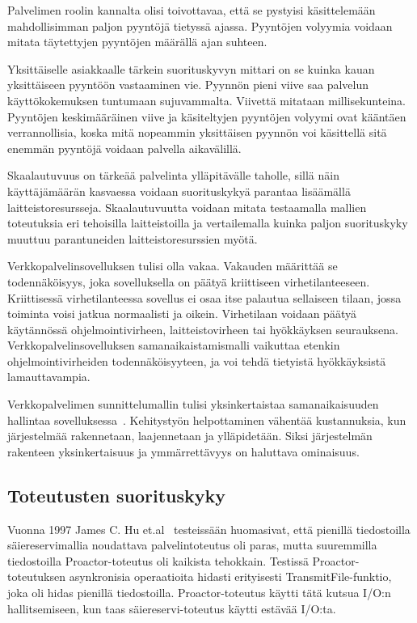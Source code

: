 \documentclass[finnish]{tktltiki2}%
\theoremstyle{definition}
\theoremstyle{remark}
\begin{document}
Palvelimen roolin kannalta olisi toivottavaa, että
se pystyisi käsittelemään mahdollisimman paljon pyyntöjä
tietyssä ajassa. Pyyntöjen volyymia voidaan
mitata täytettyjen pyyntöjen määrällä ajan suhteen.

Yksittäiselle asiakkaalle tärkein suorituskyvyn mittari on se kuinka kauan
yksittäiseen pyyntöön vastaaminen vie.
Pyynnön pieni viive saa
palvelun käyttökokemuksen tuntumaan sujuvammalta.
Viivettä mitataan millisekunteina.
Pyyntöjen keskimääräinen viive ja käsiteltyjen pyyntöjen
volyymi ovat kääntäen verrannollisia, koska
mitä nopeammin yksittäisen pyynnön voi käsittellä sitä
enemmän pyyntöjä voidaan palvella aikavälillä.

Skaalautuvuus on tärkeää palvelinta ylläpitävälle taholle, sillä
näin käyttäjämäärän kasvaessa voidaan suorituskykyä parantaa
lisäämällä laitteistoresursseja. Skaalautuvuutta voidaan
mitata testaamalla mallien toteutuksia eri tehoisilla laitteistoilla
ja vertailemalla kuinka paljon suorituskyky muuttuu 
parantuneiden laitteistoresurssien myötä.

Verkkopalvelinsovelluksen tulisi
olla vakaa. Vakauden määrittää
se todennäköisyys, joka sovelluksella on
päätyä kriittiseen virhetilanteeseen. Kriittisessä
virhetilanteessa sovellus ei osaa
itse palautua sellaiseen tilaan, jossa
toiminta voisi jatkua normaalisti ja oikein.
Virhetilaan voidaan päätyä käytännössä
ohjelmointivirheen, laitteistovirheen tai hyökkäyksen seurauksena.
Verkkopalvelinsovelluksen samanaikaistamismalli
vaikuttaa etenkin ohjelmointivirheiden todennäköisyyteen,
ja voi tehdä tietyistä hyökkäyksistä lamauttavampia.


Verkkopalvelimen sunnittelumallin tulisi
yksinkertaistaa samanaikaisuuden hallintaa sovelluksessa~\cite{hu_applying_1998}.
Kehitystyön helpottaminen vähentää kustannuksia,
kun järjestelmää rakennetaan, laajennetaan ja ylläpidetään.
Siksi järjestelmän rakenteen yksinkertaisuus ja
ymmärrettävyys on haluttava ominaisuus.

\subsection{Toteutusten suorituskyky}
Vuonna 1997 James C. Hu et.al~\cite{hu_measuring_1997} testeissään huomasivat,
että pienillä tiedostoilla säiereservimallia noudattava palvelintoteutus oli paras,
mutta suuremmilla tiedostoilla Proactor-toteutus oli kaikista tehokkain.
Testissä Proactor-toteutuksen asynkronisia operaatioita hidasti
erityisesti TransmitFile-funktio, joka oli
hidas pienillä tiedostoilla.
Proactor-toteutus käytti tätä kutsua I/O:n hallitsemiseen,
kun taas säiereservi-toteutus käytti estävää I/O:ta.
\end{document}
